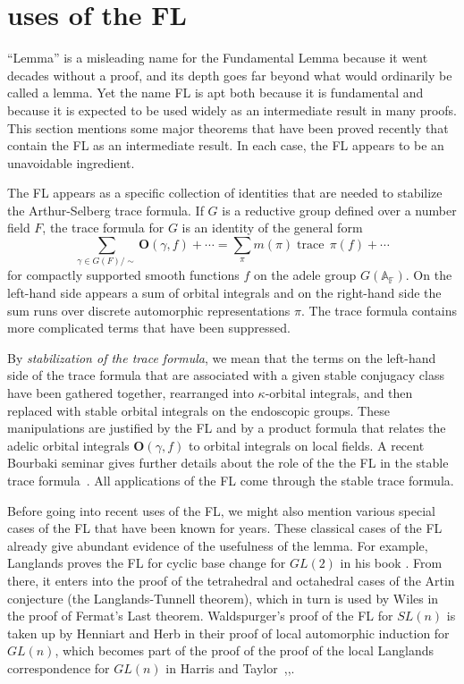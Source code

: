 \documentclass[brochure,english,12pt]{bourbaki}
\def\op#1{{\operatorname{#1}}}
\newcommand{\ring}[1]{\mathbb{#1}}
\def\OO{{\mathbf O}}
\begin{document}
\section{uses of the FL}  \label{sec:uses}

``Lemma'' is a misleading name for the Fundamental Lemma because it went decades
without a proof, and its depth goes far beyond what would ordinarily be
called a lemma.  
Yet the name FL is apt both because it is fundamental and
because it is expected to be used widely as an intermediate result in
many proofs.  This section mentions some major
theorems that have been proved recently that contain the FL as an
intermediate result.  In each case, the FL appears to be
an unavoidable ingredient.

The FL appears as a specific collection of identities
that are needed to stabilize the Arthur-Selberg trace formula.  
If $G$ is a reductive group defined over a number field $F$, 
the trace formula for $G$ is an identity of the general form
\[
\sum_{\gamma\in G(F)/\sim} \OO(\gamma,f) +\cdots = \sum_\pi m(\pi) \op{trace}\, \pi(f) + \cdots
\]
for compactly supported smooth functions $f$ on the adele group
$G(\ring{A_F})$.  On the left-hand side appears a sum of orbital integrals
and on the right-hand side the sum runs over discrete automorphic
representations $\pi$.    The trace formula contains more complicated terms that have
been suppressed.

By {\it stabilization of the trace formula}, we mean that the terms on
the left-hand side of the trace formula that are associated with a
given stable conjugacy class have been gathered together, rearranged
into $\kappa$-orbital integrals, and then replaced with stable orbital
integrals on the endoscopic groups.  These manipulations are justified
by the FL and by a product formula that relates the adelic orbital
integrals $\OO(\gamma,f)$ to orbital integrals on local fields.  A
recent Bourbaki seminar gives further details about the role of the
the FL in the stable trace formula~\cite{Dat:2004}.  All applications
of the FL come through the stable trace formula.

Before going into recent uses of the FL, we might also mention various
special cases of the FL that have been known for years.  These classical
cases of the FL already give abundant evidence of the usefulness of
the lemma.  For example, Langlands proves the FL for
cyclic base change for $GL(2)$ in his book \cite[Lemma~5.10]{LBC:1980}.
From there, it enters into the proof of the tetrahedral and
octahedral cases of the Artin conjecture (the Langlands-Tunnell theorem),
which in turn is used by Wiles in the proof of Fermat's Last theorem.
Waldspurger's proof of the FL for $SL(n)$ is taken up by Henniart and Herb in their
proof of local automorphic induction for $GL(n)$, which becomes part of the
proof of the proof of the local Langlands correspondence for $GL(n)$
in Harris and Taylor~\cite{Wald:1991},\cite{Herb:Autoinduct},\cite{Harris:Taylor:local}.  
\end{document}
